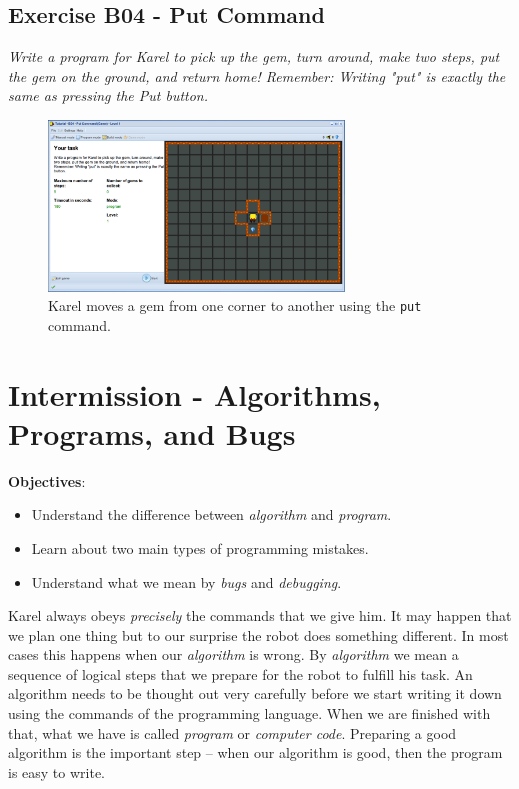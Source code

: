 \documentclass[article,A4,12pt]{llncs}
\begin{document}
\subsection{Exercise B04 - Put Command}

{\em Write a program for Karel to pick up the gem, turn around, make 
two steps, put the gem on the ground, and return home! Remember: 
Writing "put" is exactly the same as pressing the Put button.}

\newpage

\begin{figure}[!ht]
\begin{center}
\includegraphics[width=0.7\textwidth]{img/b04.png}
\end{center}
\vspace{-4mm}
\caption{Karel moves a gem from one corner to another using the {\tt put} command.}
\label{fig:b04}
\vspace{-4mm}
\end{figure}
\noindent

\section{Intermission - Algorithms, Programs, and Bugs}

\noindent
{\bf Objectives}: 
\begin{itemize}
\item Understand the difference between {\em algorithm} and {\em program}. 
\item Learn about two main types of programming mistakes.
\item Understand what we mean by {\em bugs} and {\em debugging}.
\end{itemize}
Karel always obeys {\em precisely} the commands that we give him. It may happen that 
we plan one thing but to our surprise the robot does something different. In most cases this 
happens when our {\em algorithm} is wrong. By {\em algorithm} we mean a sequence of 
logical steps that we prepare for the robot to fulfill his task. 
An algorithm needs to be thought out very carefully before we start writing 
it down using the commands of the programming language. When we are finished 
with that, what we have is called {\em program} or {\em computer code}. 
Preparing a good algorithm is the important step -- when our algorithm is good, then 
the program is easy to write.
\end{document}
